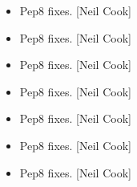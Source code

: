 \documentclass[a4paper,10pt,english]{report}
\begin{document}
\begin{itemize}
\item {} 
Pep8 fixes. {[}Neil Cook{]}

\item {} 
Pep8 fixes. {[}Neil Cook{]}

\item {} 
Pep8 fixes. {[}Neil Cook{]}

\item {} 
Pep8 fixes. {[}Neil Cook{]}

\item {} 
Pep8 fixes. {[}Neil Cook{]}

\item {} 
Pep8 fixes. {[}Neil Cook{]}

\item {} 
Pep8 fixes. {[}Neil Cook{]}

\end{itemize}
\end{document}
